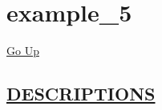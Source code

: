 \chapter*{\color{headfile}
example_5
}
\hypertarget{ecldoc:toc:example_5}{}
\hyperlink{ecldoc:toc:root}{Go Up}


\section*{\underline{\textsf{DESCRIPTIONS}}}

